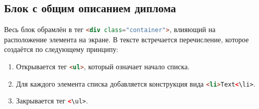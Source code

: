\subsection{Блок с общим описанием диплома}
Весь блок обрамлён в тег \lstinline[language=HTML]{<div class="container">}, влияющий на расположение элемента на экране. В тексте встречается перечисление, которое создаётся по следующему принципу:
\begin{enumerate}
	\item Открывается тег \lstinline[language=HTML]{<ul>}, который означает начало списка.
	\item Для каждого элемента списка добавляется конструкция вида \lstinline[language=HTML]{<li>Text<\li>}.
	\item Закрывается тег \lstinline[language=HTML]{<\ul>}.
\end{enumerate}